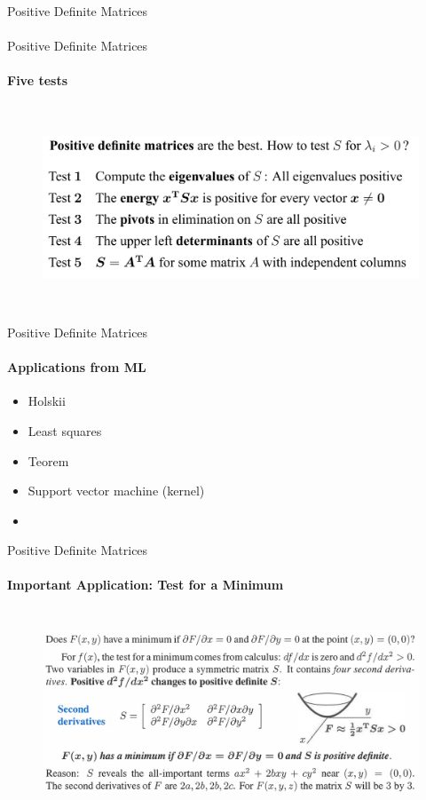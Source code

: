 \documentclass[aspectratio=169]{beamer}
\begin{document}
\begin{frame}[t]{Positive Definite Matrices}
\framesubtitle{}
    
\end{frame}

\begin{frame}[t]{Positive Definite Matrices}
\framesubtitle{Five tests}
    \begin{figure}[H]
        \centering\includegraphics[height=6cm,width=1\textwidth,keepaspectratio]{positive_definite_tests.png}
        \label{fig:positive_definite_tests.png}
    \end{figure}
\end{frame}

\begin{frame}[t]{Positive Definite Matrices}
\framesubtitle{Applications from ML}
    \begin{itemize}
        \item Holskii
        \item Least squares
        \item Teorem 
        \item Support vector machine (kernel)
        \item 
    \end{itemize}
\end{frame}


\begin{frame}[t]{Positive Definite Matrices}
    \framesubtitle{Important Application: Test for a Minimum}
    \vspace{-0.5cm}
        \begin{figure}[H]
            \centering\includegraphics[height=6cm,width=1\textwidth,keepaspectratio]{test_for_minimum.png}
            \label{fig:test_for_minimum.png}
        \end{figure}
    \end{frame}
\end{document}
